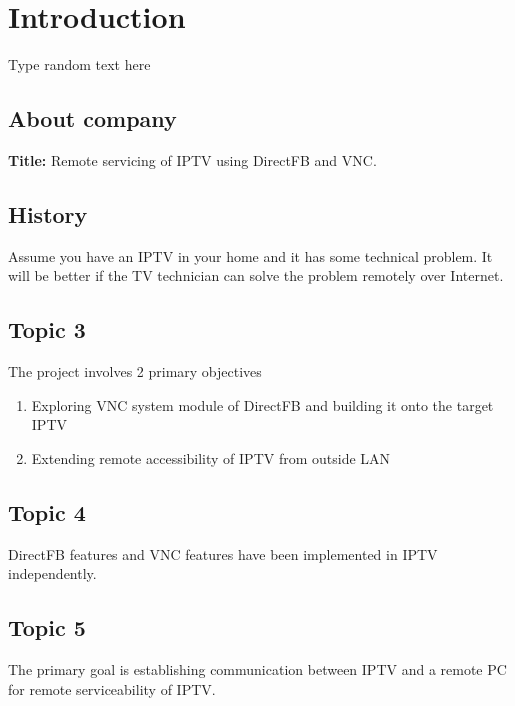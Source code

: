 \chapter{Introduction}
Type random text here
\section{About company}
\textbf{Title:} Remote servicing of IPTV using DirectFB and VNC.

\section{History}
Assume you have an IPTV in your home and it has some technical problem. It will be better if the TV technician can solve the problem remotely over Internet. 

\section{Topic 3}
The project involves 2 primary objectives
\begin{enumerate}
\item Exploring VNC system module of DirectFB and building it onto the target IPTV
\item Extending remote accessibility of IPTV from outside LAN
\end{enumerate}

\section{Topic 4}
DirectFB features and VNC features have been implemented in IPTV independently.

\section{Topic 5}
The primary goal is establishing communication between IPTV and a remote PC for remote serviceability of IPTV.




